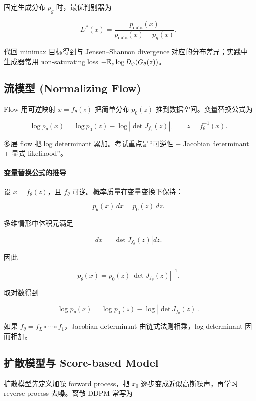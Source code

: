 固定生成分布 \(p_g\) 时，最优判别器为

\[
  D^*(x)=\frac{p_{\mathrm{data}}(x)}{p_{\mathrm{data}}(x)+p_g(x)}.
\]

代回 minimax 目标得到与 Jensen--Shannon divergence 对应的分布差异；实践中生成器常用 non-saturating loss \(-\mathbb{E}_z\log D_\psi(G_\theta(z))\)。

\subsection{流模型 (Normalizing Flow)}


Flow 用可逆映射 \(x=f_\theta(z)\) 把简单分布 \(p_0(z)\) 推到数据空间。变量替换公式为

\[
  \log p_\theta(x)
  =
  \log p_0(z)
  -
  \log\left|\det J_{f_\theta}(z)\right|,
  \qquad
  z=f_\theta^{-1}(x).
\]

多层 flow 把 log determinant 累加。考试重点是“可逆性 + Jacobian determinant + 显式 likelihood”。

\paragraph{变量替换公式的推导}

设 \(x=f_\theta(z)\)，且 \(f_\theta\) 可逆。概率质量在变量变换下保持：

\[
  p_\theta(x)\,dx
  =
  p_0(z)\,dz.
\]

多维情形中体积元满足

\[
  dx
  =
  \left|\det J_{f_\theta}(z)\right|dz.
\]

因此

\[
  p_\theta(x)
  =
  p_0(z)
  \left|
    \det J_{f_\theta}(z)
  \right|^{-1}.
\]

取对数得到

\[
  \log p_\theta(x)
  =
  \log p_0(z)
  -
  \log\left|\det J_{f_\theta}(z)\right|.
\]

如果 \(f_\theta=f_L\circ\cdots\circ f_1\)，Jacobian determinant 由链式法则相乘，log determinant 因而相加。

\subsection{扩散模型与 Score-based Model}


扩散模型先定义加噪 forward process，把 \(x_0\) 逐步变成近似高斯噪声，再学习 reverse process 去噪。离散 DDPM 常写为

